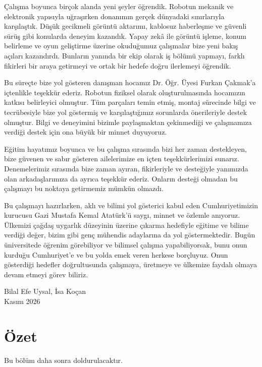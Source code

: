 \documentclass[11pt,a4paper]{article}
\begin{document}
Çalışma boyunca birçok alanda yeni şeyler öğrendik. Robotun mekanik ve elektronik yapısıyla uğraşırken donanımın gerçek dünyadaki sınırlarıyla karşılaştık. Düşük gecikmeli görüntü aktarımı, kablosuz haberleşme ve güvenli sürüş gibi konularda deneyim kazandık. Yapay zekâ ile görüntü işleme, konum belirleme ve oyun geliştirme üzerine okuduğumuz çalışmalar bize yeni bakış açıları kazandırdı. Bunların yanında bir ekip olarak iş bölümü yapmayı, farklı fikirleri bir araya getirmeyi ve ortak bir hedefe doğru ilerlemeyi öğrendik.

Bu süreçte bize yol gösteren danışman hocamız Dr. Öğr. Üyesi Furkan Çakmak'a içtenlikle teşekkür ederiz. Robotun fiziksel olarak oluşturulmasında hocamızın katkısı belirleyici olmuştur. Tüm parçaları temin etmiş, montaj sürecinde bilgi ve tecrübesiyle bize yol göstermiş ve karşılaştığımız sorunlarda önerileriyle destek olmuştur. Bilgi ve deneyimini bizimle paylaşmaktan çekinmediği ve çalışmamıza verdiği destek için ona büyük bir minnet duyuyoruz.

Eğitim hayatımız boyunca ve bu çalışma sırasında bizi her zaman destekleyen, bize güvenen ve sabır gösteren ailelerimize en içten teşekkürlerimizi sunarız. Denemelerimiz sırasında bize zaman ayıran, fikirleriyle ve desteğiyle yanımızda olan arkadaşlarımıza da ayrıca teşekkür ederiz. Onların desteği olmadan bu çalışmayı bu noktaya getirmemiz mümkün olmazdı.

Bu çalışmayı hazırlarken, aklı ve bilimi yol gösterici kabul eden Cumhuriyetimizin kurucusu Gazi Mustafa Kemal Atatürk'ü saygı, minnet ve özlemle anıyoruz. Ülkemizi çağdaş uygarlık düzeyinin üzerine çıkarma hedefiyle eğitime ve bilime verdiği değer, bizim gibi genç mühendis adaylarına da yol göstermektedir. Bugün üniversitede öğrenim görebiliyor ve bilimsel çalışma yapabiliyorsak, bunu onun kurduğu Cumhuriyet'e ve bu yolda emek veren herkese borçluyuz. Onun gösterdiği hedefler doğrultusunda çalışmaya, üretmeye ve ülkemize faydalı olmaya devam etmeyi görev biliriz.

\vspace{1.2cm}
\noindent\hfill Bilal Efe Uysal, İsa Koçan\\
\hspace*{\fill}Kasım 2026

\newpage

\section*{Özet}
Bu bölüm daha sonra doldurulacaktır.
\end{document}
